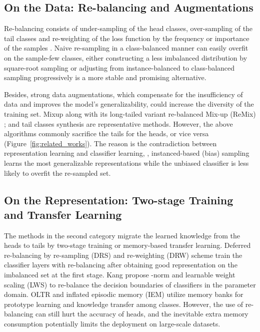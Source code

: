 \documentclass[10pt,twocolumn,letterpaper]{article}
\begin{document}
\subsection{On the Data: Re-balancing and Augmentations}
\label{sec:rebalancing}
Re-balancing consists of under-sampling of the head classes, over-sampling of the tail classes and re-weighting of the loss function by the frequency or importance of the samples \cite{japkowicz2002class, lin2017focal, cui2019class, cao2019learning}. Naive re-sampling in a class-balanced manner \cite{Huang_2016_CVPR,wang2017learning} can easily overfit on the sample-few classes, either constructing a less imbalanced distribution by square-root sampling \cite{mikolov2013distributed} or adjusting from instance-balanced to class-balanced sampling progressively \cite{cao2019learning, cui2019class, zhou2020bbn} is a more stable and promising alternative. 

Besides, strong data augmentations, which compensate for the insufficiency of data and improves the model's generalizability, could increase the diversity of the training set. Mixup \cite{zhang2017mixup} along with its long-tailed variant re-balanced Mix-up (ReMix) \cite{chou2020remix}; and tail classes synthesis \cite{zhang2021bag} are representative methods. However, the above algorithms commonly sacrifice the tails for the heads, or vice versa (Figure~\ref{fig:related_works}). The reason is the contradiction between representation learning and classifier learning, \ie, instanced-based (bias) sampling learns the most generalizable representations while the unbiased classifier is less likely to overfit the re-sampled set.

\subsection{On the Representation: Two-stage Training and Transfer Learning} 
The methods in the second category migrate the learned knowledge from the heads to tails by two-stage training or memory-based transfer learning. Deferred re-balancing by re-sampling (DRS) and re-weighting (DRW) scheme \cite{cao2019learning} train the classifier layers with re-balancing after obtaining good representation on the imbalanced set at the first stage. Kang \etal \cite{kang2019decoupling} propose -norm and learnable weight scaling (LWS) to re-balance the decision boundaries of classifiers in the parameter domain. OLTR \cite{liu2019large} and inflated episodic memory (IEM) \cite{zhu2020inflated} utilize memory banks for prototype learning and knowledge transfer among classes. However, the use of re-balancing can still hurt the accuracy of heads, and the inevitable extra memory consumption potentially limits the deployment on large-scale datasets.
\end{document}

